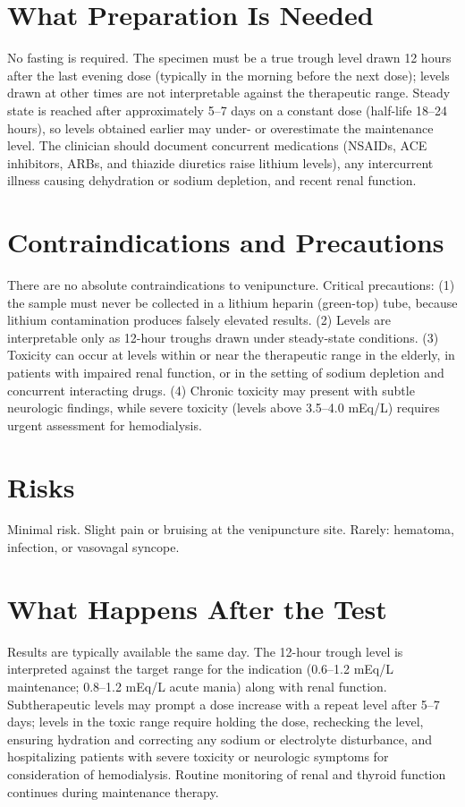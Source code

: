 \section*{What Preparation Is Needed}
No fasting is required. The specimen must be a true trough level drawn 12 hours after the last evening dose (typically in the morning before the next dose); levels drawn at other times are not interpretable against the therapeutic range. Steady state is reached after approximately 5--7 days on a constant dose (half-life 18--24 hours), so levels obtained earlier may under- or overestimate the maintenance level. The clinician should document concurrent medications (NSAIDs, ACE inhibitors, ARBs, and thiazide diuretics raise lithium levels), any intercurrent illness causing dehydration or sodium depletion, and recent renal function.

\section*{Contraindications and Precautions}
There are no absolute contraindications to venipuncture. Critical precautions: (1) the sample must never be collected in a lithium heparin (green-top) tube, because lithium contamination produces falsely elevated results. (2) Levels are interpretable only as 12-hour troughs drawn under steady-state conditions. (3) Toxicity can occur at levels within or near the therapeutic range in the elderly, in patients with impaired renal function, or in the setting of sodium depletion and concurrent interacting drugs. (4) Chronic toxicity may present with subtle neurologic findings, while severe toxicity (levels above 3.5--4.0 mEq/L) requires urgent assessment for hemodialysis.

\section*{Risks}
Minimal risk. Slight pain or bruising at the venipuncture site. Rarely: hematoma, infection, or vasovagal syncope.

\section*{What Happens After the Test}
Results are typically available the same day. The 12-hour trough level is interpreted against the target range for the indication (0.6--1.2 mEq/L maintenance; 0.8--1.2 mEq/L acute mania) along with renal function. Subtherapeutic levels may prompt a dose increase with a repeat level after 5--7 days; levels in the toxic range require holding the dose, rechecking the level, ensuring hydration and correcting any sodium or electrolyte disturbance, and hospitalizing patients with severe toxicity or neurologic symptoms for consideration of hemodialysis. Routine monitoring of renal and thyroid function continues during maintenance therapy.

